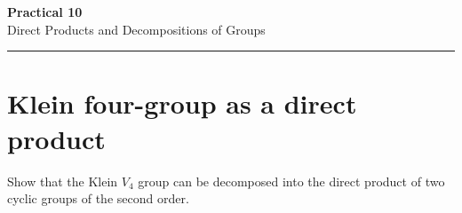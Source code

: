 \documentclass[12pt,a4paper]{article}
\newenvironment{problem}{\begin{mdframed}[style=problemstyle]}{\end{mdframed}}
\begin{document}

\begin{mdframed}[
  linewidth=0pt,
  backgroundcolor=SectCol,
  roundcorner=4pt,
  innertopmargin=14pt,
  innerbottommargin=14pt,
  font=\color{white}\centering
]
  {\fontsize{22}{26}\selectfont\bfseries\sffamily Practical 10}\\[8pt]
  {\large\sffamily Direct Products and Decompositions of Groups}\\[6pt]
  {\color{white!70!SectCol}\rule{5cm}{0.4pt}}
\end{mdframed}

\vspace{1.2em}

\section{Klein four-group as a direct product}

\begin{problem}
Show that the Klein $V_4$ group can be decomposed into the direct product
of two cyclic groups of the second order.
\end{problem}
\end{document}
